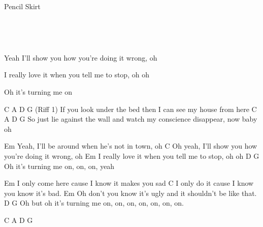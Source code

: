 \begin{song}{Pencil Skirt}{
	

	\mbox{ \CMaj \AMaj \DMaj \GMaj }


	\mbox{ \EmShAm \CMajShE \DMajShA \GMajShE}
	
}
\begin{SongVerse}
 Yeah I'll show you how you're doing it wrong, oh 


 I really love it when you tell me to stop, oh oh 
                
 
 Oh it's turning me on

\end{SongVerse}

\begin{SongVerse}
 C                      A              D                 G    (Riff 1)
 If you look under the bed then I can see my house from here
 C                        A                     D           G
 So just lie against the wall and watch my conscience disappear, now baby oh


 Em
 Yeah, I'll be around when he's not in town, oh
 C
 Oh yeah, I'll show you how you're doing it wrong, oh
 Em
 I really love it when you tell me to stop, oh oh
 D                  G
 Oh it's turning me on, on, on, yeah

 Em
 I only come here cause I know it makes you sad
 C
 I only do it cause I know you know it's bad.
 Em
 Oh don't you know it's ugly and it shouldn't be like that.
 D                         G
 Oh but oh it's turning me on, on, on, on, on, on, on.


 C    A    D    G
 \end{SongVerse}

\end{song}